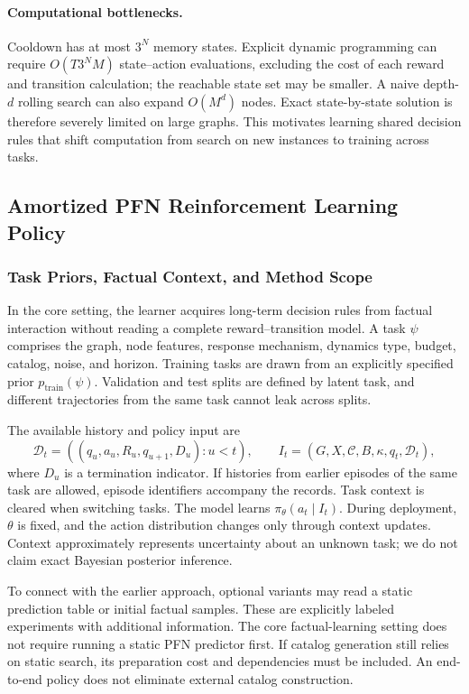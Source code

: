 \documentclass[a4paper,11pt]{article}
\numberwithin{equation}{section}
\begin{document}
\paragraph{Computational bottlenecks.}
Cooldown has at most $3^N$ memory states. Explicit dynamic programming can require $O(T3^NM)$ state--action evaluations, excluding the cost of each reward and transition calculation; the reachable state set may be smaller. A naive depth-$d$ rolling search can also expand $O(M^d)$ nodes. Exact state-by-state solution is therefore severely limited on large graphs. This motivates learning shared decision rules that shift computation from search on new instances to training across tasks.

\subsection{Amortized PFN Reinforcement Learning Policy}
\label{sec:pfn}
\subsubsection{Task Priors, Factual Context, and Method Scope}
In the core setting, the learner acquires long-term decision rules from factual interaction without reading a complete reward--transition model. A task $\psi$ comprises the graph, node features, response mechanism, dynamics type, budget, catalog, noise, and horizon. Training tasks are drawn from an explicitly specified prior $p_{\mathrm{train}}(\psi)$. Validation and test splits are defined by latent task, and different trajectories from the same task cannot leak across splits.

The available history and policy input are
\begin{equation}
\mathcal D_t=((q_u,a_u,R_u,q_{u+1},D_u):u<t),\qquad
I_t=(G,X,\mathcal C,B,\kappa,q_t,\mathcal D_t),
\label{eq:context}
\end{equation}
where $D_u$ is a termination indicator. If histories from earlier episodes of the same task are allowed, episode identifiers accompany the records. Task context is cleared when switching tasks. The model learns $\pi_\theta(a_t\mid I_t)$. During deployment, $\theta$ is fixed, and the action distribution changes only through context updates. Context approximately represents uncertainty about an unknown task; we do not claim exact Bayesian posterior inference.

To connect with the earlier approach, optional variants may read a static prediction table or initial factual samples. These are explicitly labeled experiments with additional information. The core factual-learning setting does not require running a static PFN predictor first. If catalog generation still relies on static search, its preparation cost and dependencies must be included. An end-to-end policy does not eliminate external catalog construction.
\end{document}
